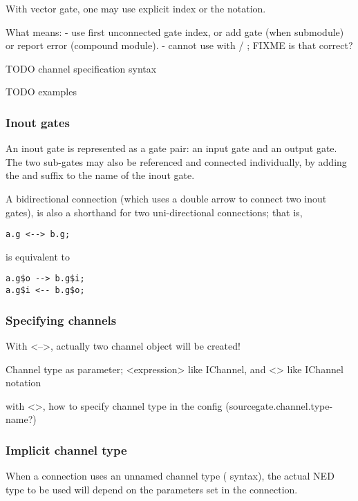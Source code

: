 With vector gate, one may use explicit index or the  notation.

What \ttt{++} means:
 - use first unconnected gate index, or add gate (when submodule) or report error (compound module).
 - cannot use \ttt{++} with  / ; FIXME is that correct?

TODO channel specification syntax

TODO examples


\subsubsection{Inout gates}

An inout gate is represented as a gate pair: an input gate and an output gate.
The two sub-gates may also be referenced and connected individually, by adding
the  and  suffix to the name of the inout gate.

A bidirectional connection (which uses a double arrow to connect two inout gates),
is also a shorthand for two uni-directional connections; that is,

\begin{verbatim}
a.g <--> b.g;
\end{verbatim}

is equivalent to
\begin{verbatim}
a.g$o --> b.g$i;
a.g$i <-- b.g$o;
\end{verbatim}


\subsubsection{Specifying channels}

With <-->, actually two channel object will be created!

Channel type as parameter; <expression> like IChannel, and <> like IChannel notation

with <>, how to specify channel type in the config (sourcegate.channel.type-name?)



\subsubsection{Implicit channel type}

When a connection uses an unnamed channel type (\ttt{-{}->
\{\ldots\} -{}->} syntax), the actual NED type to be used will depend on the
parameters set in the connection.

